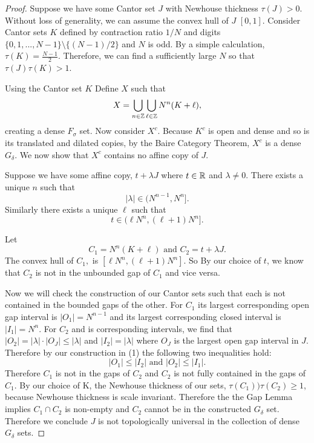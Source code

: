 \begin{proof} Suppose we have some Cantor set $J$ with Newhouse thickness $\tau(J) >0$. Without loss of generality, we  can assume  the convex hull of $J$ $[0,1]$.   Consider Cantor sets $K$ defined by contraction ratio $1/N$ and digits $\{0,1,...,N-1\}\setminus\{(N-1)/2\}$ and $N$ is odd. By a simple calculation,  $\tau (K) = \frac{N-1}{2}$. Therefore,  we can find a  sufficiently large $N$ so that $\tau(J)\tau(K)>1$. 

\medskip

Using the Cantor set $K$ Define $X$ such that $$
X = \bigcup_{n \in \mathbb{Z}} \bigcup_{\ell \in \mathbb{Z}} N^n(K+\ell),
$$creating a dense $F_\sigma$ set. Now consider $X^c$.  Because $K^c$ is open and dense and so is its translated and dilated copies, by the Baire Category Theorem, $X^c$ is a dense $G_{\delta}$.  We now show that $X^c$ contains no affine copy of $J$. 

\medskip

Suppose we have some affine copy, $t+ \lambda J$ where $t\in\mathbb{R}$ and $\lambda\ne 0$. There exists a unique $n$ such that 
\begin{equation}
    |\lambda| \in (N^{n-1}, N^n].
\end{equation}
Similarly there exists a unique $\ell$ such that 
\begin{equation}
t \in (\ell  N^n, (\ell+1)N^n].    
\end{equation}


Let 
$$C_1 = N^n(K+\ell) \text{ and } C_2 = t+ \lambda J.$$
The convex hull of $C_1,$ is  $[\ell  N^n, (\ell+1)N^n]$.  So By our choice of $t$, we know that $C_2$ is not in the unbounded gap of $C_1$ and vice versa.  

Now we will check the construction of our Cantor sets such that each is not contained in the bounded gaps of the other. For $C_1$ its largest corresponding open gap interval is $|O_1| = N^{n-1}$ and its largest corresponding closed interval is $|I_1| = N^n$. For $C_2$ and is corresponding intervals, we find that $|O_2| =|\lambda|\cdot |O_J| \le |\lambda|$ and $|I_2| = |\lambda|$ where $O_J$ is the largest  open gap interval in $J$.  Therefore by our construction in (1) the following two inequalities hold: $$|O_1|\leq |I_2| \text { and } |O_2| \leq |I_1|.$$ Therefore $C_1$ is not in the gaps of $C_2$ and $C_2$ is not fully contained in the gaps of $C_1$.  By our choice of K, the Newhouse thickness of our sets, $\tau(C_1))\tau(C_2) \geq 1$, because Newhouse thickness is scale invariant.  Therefore the the Gap Lemma implies $C_1 \cap C_2$ is non-empty and $C_2$ cannot be in the constructed $G_{\delta} $ set. Therefore we conclude $J$ is not topologically universal in the collection of dense $G_\delta$ sets.  



\end{proof}
